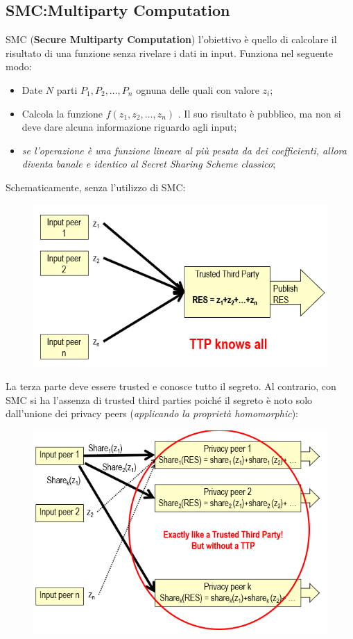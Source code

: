 \documentclass{book}
\begin{document}
\subsection{SMC:\@Secure Multiparty Computation}
SMC (\textbf{Secure Multiparty Computation}) l'obiettivo è quello di calcolare il risultato di una funzione senza rivelare i dati in input\@. Funziona nel seguente modo:
\begin{itemize}
	\item Date \(N\) parti \(P_{1},P_{2},\dots,P_{n}\) ognuna delle quali con valore \(z_{i}\);
	\item Calcola la funzione \(f(z_{1},z_{2},\dots,z_{n})\) \@. Il suo risultato è pubblico, ma non si deve dare alcuna informazione riguardo agli input;
	\item \emph{se l'operazione è una funzione lineare al più pesata da dei coefficienti, allora diventa banale e identico al Secret Sharing Scheme classico};
\end{itemize}
Schematicamente, senza l'utilizzo di SMC:\@
\begin{figure}[h]
	\centering
	\includegraphics[scale=0.5]{2021-12-29-23-00-13.png}%
\end{figure}
La terza parte deve essere trusted e conosce tutto il segreto\@.\newpage
Al contrario, con SMC si ha l'assenza di trusted third parties poiché il segreto è noto solo dall'unione dei privacy peers (\emph{applicando la proprietà homomorphic}):
\begin{figure}[h]
	\begin{center}
		\includegraphics[scale=0.4]{2021-12-29-23-03-44.png}%
	\end{center}
\end{figure}
\end{document}
